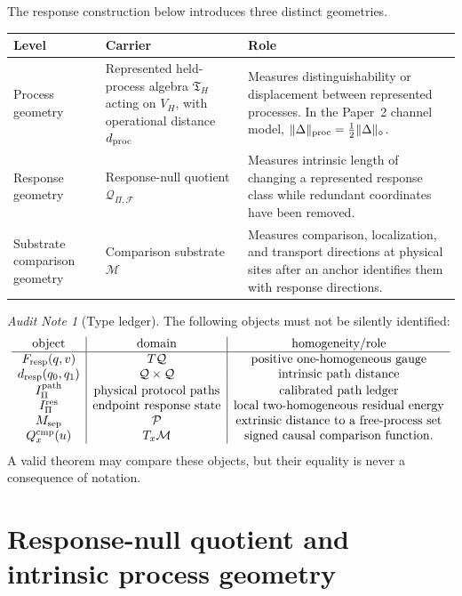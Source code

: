 \documentclass[11pt]{article}
\theoremstyle{remark}
\newtheorem{audit}[theorem]{Audit Note}
\newcommand{\Mgeom}{\mathcal M}
\newcommand{\Pproc}{\mathcal P}
\newcommand{\Qresp}{\mathcal Q}
\newcommand{\Fresp}{F_{\rm resp}}
\newcommand{\dresp}{d_{\rm resp}}
\newcommand{\dproc}{d_{\rm proc}}
\newcommand{\Qcmp}{Q^{\rm cmp}}
\newcommand{\VH}{V_H}
\newcommand{\Tproc}{\mathfrak T_H}
\begin{document}
The response construction below introduces three distinct geometries.

\begin{longtable}{p{}p{}p{}}
\toprule
Level & Carrier & Role \\
\midrule
Process geometry & Represented held-process algebra $\Tproc$ acting on $\VH$, with operational distance $\dproc$ & Measures distinguishability or displacement between represented processes.  In the Paper~2 channel model, $\|\Delta\|_{\rm proc}=\tfrac12\|\Delta\|_\diamond$. \\
Response geometry & Response-null quotient $\Qresp_{\Pi,\mathcal F}$ & Measures intrinsic length of changing a represented response class while redundant coordinates have been removed. \\
Substrate comparison geometry & Comparison substrate $\Mgeom$ & Measures comparison, localization, and transport directions at physical sites after an anchor identifies them with response directions. \\
\bottomrule
\end{longtable}

\begin{audit}[Type ledger]
The following objects must not be silently identified:
\[
\begin{array}{c|c|c}
\text{object} & \text{domain} & \text{homogeneity/role}\\ \hline
\Fresp(q,v) & T\Qresp & \text{positive one-homogeneous gauge}\\
\dresp(q_0,q_1) & \Qresp\times\Qresp & \text{intrinsic path distance}\\
I_\Pi^{\rm path} & \text{physical protocol paths} & \text{calibrated path ledger}\\
I_\Pi^{\rm res} & \text{endpoint response state} & \text{local two-homogeneous residual energy}\\
M_{\rm sep} & \Pproc & \text{extrinsic distance to a free-process set}\\
\Qcmp_x(u) & T_x\Mgeom & \text{signed causal comparison function}.
\end{array}
\]
A valid theorem may compare these objects, but their equality is never a consequence of notation.
\end{audit}

\section{Response-null quotient and intrinsic process geometry}
\label{sec:metric-emergence}
\end{document}
